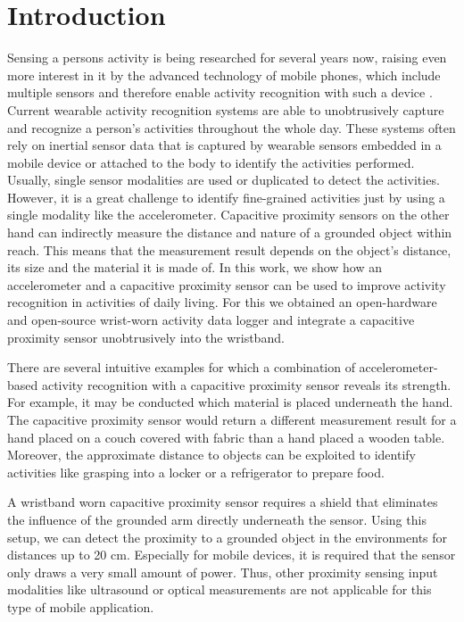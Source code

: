\documentclass[runningheads,a4paper]{llncs}
\begin{document}
\section{Introduction}

Sensing a persons activity is being researched for several years now, raising even more interest in it by the advanced technology of mobile phones, which include multiple sensors and therefore enable activity recognition with such a device \cite{brezmes2009activity}. Current wearable activity recognition systems are able to unobtrusively capture and recognize a person's activities throughout the whole day. These systems often rely on inertial sensor data that is captured by wearable sensors embedded in a mobile device \cite{brezmes2009activity} or attached to the body \cite{Ravi2005} to identify the activities performed. Usually, single sensor modalities are used or duplicated to detect the activities. However, it is a great challenge to identify fine-grained activities just by using a single modality like the accelerometer.
Capacitive proximity sensors on the other hand can indirectly measure the distance and nature of a grounded object within reach. This means that the measurement result depends on the object's distance, its size and the material it is made of. In this work, we show how an accelerometer and a capacitive proximity sensor can be used to improve activity recognition in activities of daily living.
For this we obtained an open-hardware and open-source wrist-worn activity data logger \cite{hedgehog} and integrate a capacitive proximity sensor unobtrusively into the wristband.

There are several intuitive examples for which a combination of accelerometer-based activity recognition with a capacitive proximity sensor reveals its strength. For example, it may be conducted which material is placed underneath the hand. The capacitive proximity sensor would return a different measurement result for a hand placed on a couch covered with fabric than a hand placed a wooden table. Moreover, the approximate distance to objects can be exploited to identify activities like grasping into a locker or a refrigerator to prepare food.

A wristband worn capacitive proximity sensor requires a shield that eliminates the influence of the grounded arm directly underneath the sensor. Using this setup, we can detect the proximity to a grounded object in the environments for distances up to 20 cm. Especially for mobile devices, it is required that the sensor only draws a very small amount of power. Thus, other proximity sensing input modalities like ultrasound or optical measurements are not applicable for this type of mobile application.
\end{document}
